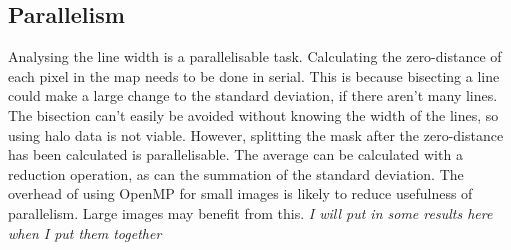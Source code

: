 \documentclass[../main.tex]{subfiles}
\begin{document}
  \subsection{Parallelism}
    Analysing the line width is a parallelisable task.
    Calculating the zero-distance of each pixel in the map needs to be done in serial.
    This is because bisecting a line could make a large change to the standard deviation, if there aren't many lines.
    The bisection can't easily be avoided without knowing the width of the lines, so using halo data is not viable.
    However, splitting the mask after the zero-distance has been calculated is parallelisable.
    The average can be calculated with a reduction operation, as can the summation of the standard deviation.
    The overhead of using OpenMP for small images is likely to reduce usefulness of parallelism.
    Large images may benefit from this.
    \textit{I will put in some results here when I put them together}
\end{document}
